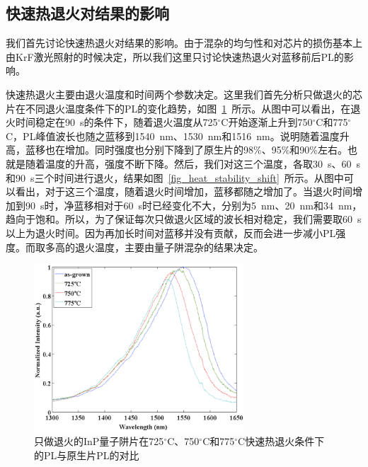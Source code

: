 \documentclass{ZJUthesis}
\begin{document}
\subsection{快速热退火对结果的影响}

我们首先讨论快速热退火对结果的影响。由于混杂的均匀性和对芯片的损伤基本上由KrF激光照射的时候决定，所以我们这里只讨论快速热退火对蓝移前后PL的影响。

快速热退火主要由退火温度和时间两个参数决定。这里我们首先分析只做退火的芯片在不同退火温度条件下的PL的变化趋势，如图~\ref{fig_heat_stability}~所示。从图中可以看出，在退火时间稳定在90~s的条件下，随着退火温度从725$^{\circ}$C开始逐渐上升到750$^{\circ}$C和775$^{\circ}$C，PL峰值波长也随之蓝移到1540~nm、1530~nm和1516~nm。说明随着温度升高，蓝移也在增加。同时强度也分别下降到了原生片的98\%、95\%和90\%左右。也就是随着温度的升高，强度不断下降。然后，我们对这三个温度，各取30~s、60~s和90~s三个时间进行退火，结果如图~\ref{fig_heat_stability_shift}~所示。从图中可以看出，对于这三个温度，随着退火时间增加，蓝移都随之增加了。当退火时间增加到90~s时，净蓝移相对于60~s时已经变化不大，分别为5~nm、20~nm和34~nm，趋向于饱和。所以，为了保证每次只做退火区域的波长相对稳定，我们需要取60~s以上为退火时间。因为再加长时间对蓝移并没有贡献，反而会进一步减小PL强度。而取多高的退火温度，主要由量子阱混杂的结果决定。

\begin{figure}[htbp]
    \centering
    \includegraphics[width=0.7\textwidth]{./Pictures/heat_stability.eps}
    \caption{只做退火的InP量子阱片在725$^{\circ}$C、750$^{\circ}$C和775$^{\circ}$C快速热退火条件下的PL与原生片PL的对比}
    \label{fig_heat_stability}
\end{figure}
\end{document}
